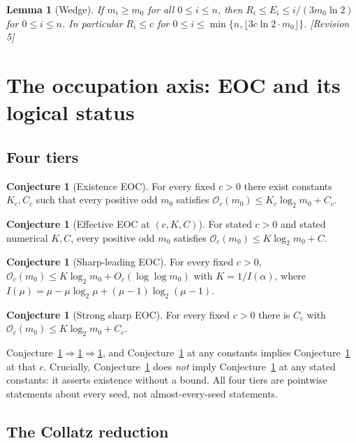 \documentclass[11pt]{article}
\theoremstyle{plain}
\newtheorem{lemma}[theorem]{Lemma}
\theoremstyle{definition}
\newtheorem{conjecture}[theorem]{Conjecture}
\theoremstyle{remark}
\newcommand{\Occ}{\mathcal{O}}
\newcommand{\al}{\alpha}
\newcommand{\status}[1]{\textsf{\footnotesize[#1]}}
\begin{document}
\begin{lemma}[Wedge]\label{lem:wedge}
If $m_i\ge m_0$ for all $0\le i\le n$, then $R_i\le E_i\le i/(3m_0\ln2)$ for $0\le i\le n$. In
particular $R_i\le c$ for $0\le i\le\min\{n,\lfloor 3c\ln2\cdot m_0\rfloor\}$.
\status{Revision 5}
\end{lemma}

\section{The occupation axis: EOC and its logical status}\label{sec:occupation}

\subsection{Four tiers}

\begin{conjecture}[Existence EOC]\label{conj:exist}
For every fixed $c>0$ there exist constants $K_c,C_c$ such that every positive odd $m_0$ satisfies
$\Occ_c(m_0)\le K_c\log_2 m_0+C_c$.
\end{conjecture}

\begin{conjecture}[Effective EOC at $(c,K,C)$]\label{conj:eff}
For stated $c>0$ and stated numerical $K,C$, every positive odd $m_0$ satisfies
$\Occ_c(m_0)\le K\log_2 m_0+C$.
\end{conjecture}

\begin{conjecture}[Sharp-leading EOC]\label{conj:sharp}
For every fixed $c>0$, $\Occ_c(m_0)\le K\log_2 m_0+O_c(\log\log m_0)$ with $K=1/I(\al)$, where
$I(\mu)=\mu-\mu\log_2\mu+(\mu-1)\log_2(\mu-1)$.
\end{conjecture}

\begin{conjecture}[Strong sharp EOC]\label{conj:strong}
For every fixed $c>0$ there is $C_c$ with $\Occ_c(m_0)\le K\log_2 m_0+C_c$.
\end{conjecture}

Conjecture~\ref{conj:strong}$\Rightarrow$\ref{conj:sharp}$\Rightarrow$\ref{conj:exist}, and
Conjecture~\ref{conj:eff} at any constants implies Conjecture~\ref{conj:exist} at that $c$.
Crucially, Conjecture~\ref{conj:exist} does \emph{not} imply Conjecture~\ref{conj:eff} at any
stated constants: it asserts existence without a bound. All four tiers are pointwise statements
about every seed, not almost-every-seed statements.

\subsection{The Collatz reduction}
\end{document}
